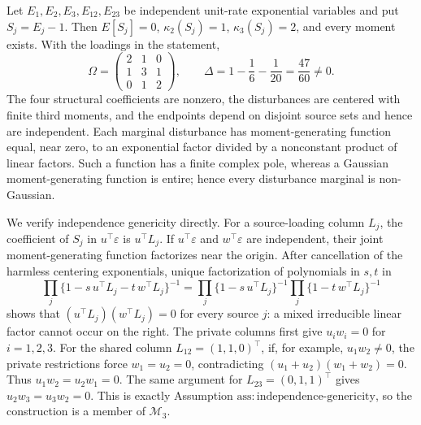 Let \(E_1,E_2,E_3,E_{12},E_{23}\) be independent unit-rate exponential variables and put \(S_j=E_j-1\). Then \(E[S_j]=0\), \(\kappa_2(S_j)=1\), \(\kappa_3(S_j)=2\), and every moment exists. With the loadings in the statement,
\[
\Omega=
\begin{pmatrix}2&1&0\\1&3&1\\0&1&2\end{pmatrix},
\qquad
\Delta=1-\frac16-\frac1{20}=\frac{47}{60}\neq0.
\]
The four structural coefficients are nonzero, the disturbances are centered with finite third moments, and the endpoints depend on disjoint source sets and hence are independent. Each marginal disturbance has moment-generating function equal, near zero, to an exponential factor divided by a nonconstant product of linear factors. Such a function has a finite complex pole, whereas a Gaussian moment-generating function is entire; hence every disturbance marginal is non-Gaussian.

We verify independence genericity directly. For a source-loading column \(L_j\), the coefficient of \(S_j\) in \(u^\top\varepsilon\) is \(u^\top L_j\). If \(u^\top\varepsilon\) and \(w^\top\varepsilon\) are independent, their joint moment-generating function factorizes near the origin. After cancellation of the harmless centering exponentials, unique factorization of polynomials in \(s,t\) in
\[
\prod_j\{1-s\,u^\top L_j-t\,w^\top L_j\}^{-1}
=\prod_j\{1-s\,u^\top L_j\}^{-1}
 \prod_j\{1-t\,w^\top L_j\}^{-1}
\]
shows that \((u^\top L_j)(w^\top L_j)=0\) for every source \(j\): a mixed irreducible linear factor cannot occur on the right. The private columns first give \(u_iw_i=0\) for \(i=1,2,3\). For the shared column \(L_{12}=(1,1,0)^\top\), if, for example, \(u_1w_2\neq0\), the private restrictions force \(w_1=u_2=0\), contradicting \((u_1+u_2)(w_1+w_2)=0\). Thus \(u_1w_2=u_2w_1=0\). The same argument for \(L_{23}=(0,1,1)^\top\) gives \(u_2w_3=u_3w_2=0\). This is exactly Assumption \(\mathrm{ass:independence\mbox{-}genericity}\), so the construction is a member of \(\mathcal M_3\).

